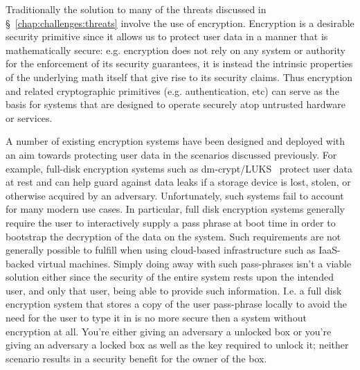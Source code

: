 Traditionally the solution to many of the threats discussed in
\S~\ref{chap:challenges:threats} involve the use of
encryption. Encryption is a desirable security primitive since it
allows us to protect user data in a manner that is mathematically
secure: e.g. encryption does not rely on any system or authority for
the enforcement of its security guarantees, it is instead the
intrinsic properties of the underlying math itself that give rise to
its security claims. Thus encryption and related cryptographic
primitives (e.g. authentication, etc) can serve as the basis for
systems that are designed to operate securely atop untrusted hardware
or services.

A number of existing encryption systems have been designed and
deployed with an aim towards protecting user data in the scenarios
discussed previously. For example, full-disk encryption systems such
as dm-crypt/LUKS~\cite{dm-crypt, luks} protect user data at rest and
can help guard against data leaks if a storage device is lost, stolen,
or otherwise acquired by an adversary. Unfortunately, such systems
fail to account for many modern use cases. In particular, full disk
encryption systems generally require the user to interactively supply
a pass phrase at boot time in order to bootstrap the decryption of the
data on the system. Such requirements are not generally possible to
fulfill when using cloud-based infrastructure such as IaaS-backed
virtual machines. Simply doing away with such pass-phrases isn't a
viable solution either since the security of the entire system rests
upon the intended user, and only that user, being able to provide such
information. I.e. a full disk encryption system that stores a copy of
the user pass-phrase locally to avoid the need for the user to type it
in is no more secure then a system without encryption at all. You're
either giving an adversary a unlocked box or you're giving an
adversary a locked box as well as the key required to unlock it;
neither scenario results in a security benefit for the owner of the
box.

